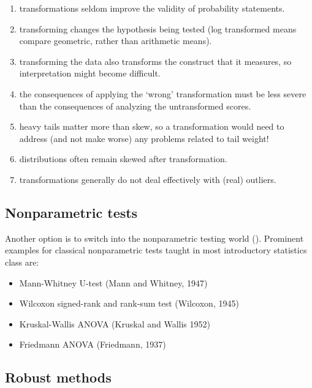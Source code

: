 \documentclass[
]{article}
\providecommand{\tightlist}{%
  \setlength{\itemsep}{0pt}\setlength{\parskip}{0pt}}
\begin{document}
\begin{enumerate}
\def\labelenumi{\arabic{enumi}.}
\tightlist
\item
  transformations seldom improve the validity of probability statements.
\item
  transforming changes the hypothesis being tested (log transformed means compare geometric, rather than arithmetic means).
\item
  transforming the data also transforms the construct that it measures, so interpretation might become difficult.
\item
  the consequences of applying the `wrong' transformation must be less severe than the consequences of analyzing the untransformed scores.
\item
  heavy tails matter more than skew, so a transformation would need to address (and not make worse) any problems related to tail weight!
\item
  distributions often remain skewed after transformation.
\item
  transformations generally do not deal effectively with (real) outliers.
\end{enumerate}

\subsection*{Nonparametric tests}\label{nonparametric-tests}

Another option is to switch into the nonparametric testing world (). Prominent examples for classical nonparametric tests taught in most introductory statistics class are:

\begin{itemize}
\tightlist
\item
  Mann-Whitney U-test (Mann and Whitney, 1947)
\item
  Wilcoxon signed-rank and rank-sum test (Wilcoxon, 1945)
\item
  Kruskal-Wallis ANOVA (Kruskal and Wallis 1952)
\item
  Friedmann ANOVA (Friedmann, 1937)
\end{itemize}

\subsection*{Robust methods}\label{robust-methods}
\end{document}
